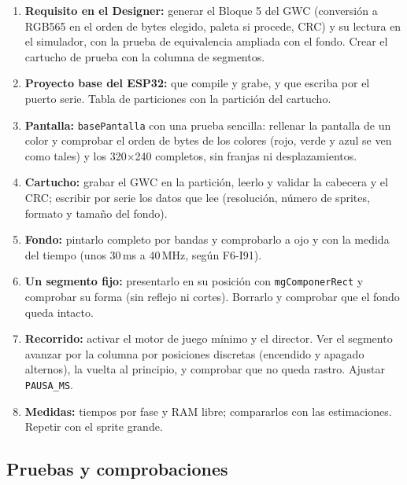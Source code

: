\begin{enumerate}
	\item \textbf{Requisito en el Designer:} generar el Bloque 5 del GWC (conversión a RGB565 en el orden de bytes elegido, paleta si procede, CRC) y su lectura en el simulador, con la prueba de equivalencia ampliada con el fondo. Crear el cartucho de prueba con la columna de segmentos.
	\item \textbf{Proyecto base del ESP32:} que compile y grabe, y que escriba por el puerto serie. Tabla de particiones con la partición del cartucho.
	\item \textbf{Pantalla:} \texttt{basePantalla} con una prueba sencilla: rellenar la pantalla de un color y comprobar el orden de bytes de los colores (rojo, verde y azul se ven como tales) y los 320$\times$240 completos, sin franjas ni desplazamientos.
	\item \textbf{Cartucho:} grabar el GWC en la partición, leerlo y validar la cabecera y el CRC; escribir por serie los datos que lee (resolución, número de sprites, formato y tamaño del fondo).
	\item \textbf{Fondo:} pintarlo completo por bandas y comprobarlo a ojo y con la medida del tiempo (unos 30\,ms a 40\,MHz, según F6-I91).
	\item \textbf{Un segmento fijo:} presentarlo en su posición con \texttt{mgComponerRect} y comprobar su forma (sin reflejo ni cortes). Borrarlo y comprobar que el fondo queda intacto.
	\item \textbf{Recorrido:} activar el motor de juego mínimo y el director. Ver el segmento avanzar por la columna por posiciones discretas (encendido y apagado alternos), la vuelta al principio, y comprobar que no queda rastro. Ajustar \texttt{PAUSA\_MS}.
	\item \textbf{Medidas:} tiempos por fase y RAM libre; compararlos con las estimaciones. Repetir con el sprite grande.
\end{enumerate}

\subsection{Pruebas y comprobaciones}
\label{sec:F6I92Pruebas}

